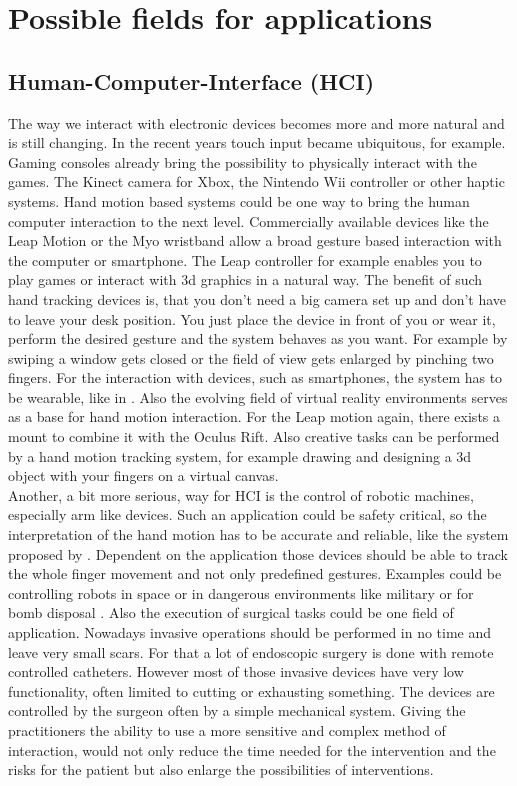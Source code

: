 {\section{Possible fields for applications} \label{sec:applications}

\subsection{Human-Computer-Interface (HCI)} \label{subsec:applications:HCI}
The way we interact with electronic devices becomes more and more natural and is still changing. In the recent years touch input became ubiquitous, for example. Gaming consoles already bring the possibility to physically interact with the games. The Kinect camera for Xbox, the Nintendo Wii controller or other haptic systems. Hand motion based systems could be one way to bring the human computer interaction to the next level. Commercially available devices like the Leap Motion or the Myo wristband allow a broad gesture based interaction with the computer or smartphone. The Leap controller for example enables you to play games or interact with 3d graphics in a natural way. The benefit of such hand tracking devices is, that you don't need a big camera set up and don't have to leave your desk position. You just place the device in front of you or wear it, perform the desired gesture and the system behaves as you want. For example by swiping a window gets closed or the field of view gets enlarged by pinching two fingers. For the interaction with devices, such as smartphones, the system has to be wearable, like in \cite{Digits}. Also the evolving field of virtual reality environments serves as a base for hand motion interaction. For the Leap motion again, there exists a mount to combine it with the Oculus Rift. Also creative tasks can be performed by a hand motion tracking system, for example drawing and designing a 3d object with your fingers on a virtual canvas.\\
Another, a bit more serious, way for HCI is the control of robotic machines, especially arm like devices. Such an application could be safety critical, so the interpretation of the hand motion has to be accurate and reliable, like the system proposed by \cite{sharp2015accurate}. Dependent on the application those devices should be able to track the whole finger movement and not only predefined gestures. Examples could be controlling robots in space \cite{dipietro2008survey} or in dangerous environments like military or for bomb disposal \cite{greenleaf1996developing}. Also the execution of surgical tasks could be one field of application. Nowadays invasive operations should be performed in no time and leave very small scars. For that a lot of endoscopic surgery is done with remote controlled catheters. However most of those invasive devices have very low functionality, often limited to cutting or exhausting something. The devices are controlled by the surgeon often by a simple mechanical system. Giving the practitioners the ability to use a more sensitive and complex method of interaction, would not only reduce the time needed for the intervention and the risks for the patient but also enlarge the possibilities of interventions.\\
}
